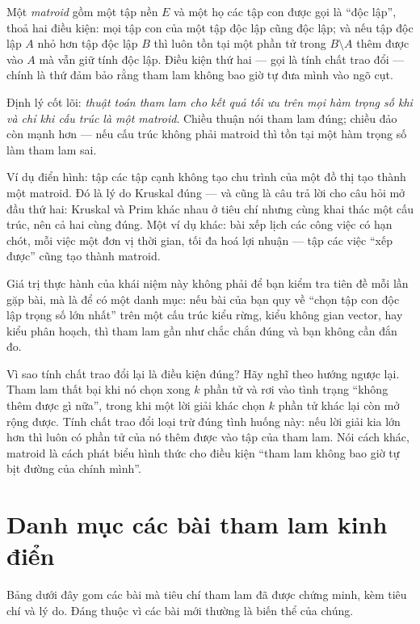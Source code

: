 \documentclass[../../algorithm.tex]{subfiles}
\begin{document}
Một \emph{matroid} gồm một tập nền \(E\) và một họ các tập con được gọi là ``độc lập'', thoả hai điều kiện: mọi tập con của một tập độc lập cũng độc lập; và nếu tập độc lập \(A\) nhỏ hơn tập độc lập \(B\) thì luôn tồn tại một phần tử trong \(B \setminus A\) thêm được vào \(A\) mà vẫn giữ tính độc lập. Điều kiện thứ hai --- gọi là tính chất trao đổi --- chính là thứ đảm bảo rằng tham lam không bao giờ tự đưa mình vào ngõ cụt.

Định lý cốt lõi: \emph{thuật toán tham lam cho kết quả tối ưu trên mọi hàm trọng số khi và chỉ khi cấu trúc là một matroid}. Chiều thuận nói tham lam đúng; chiều đảo còn mạnh hơn --- nếu cấu trúc không phải matroid thì tồn tại một hàm trọng số làm tham lam sai.

Ví dụ điển hình: tập các tập cạnh không tạo chu trình của một đồ thị tạo thành một matroid. Đó là lý do Kruskal đúng --- và cũng là câu trả lời cho câu hỏi mở đầu thứ hai: Kruskal và Prim khác nhau ở tiêu chí nhưng cùng khai thác một cấu trúc, nên cả hai cùng đúng. Một ví dụ khác: bài xếp lịch các công việc có hạn chót, mỗi việc một đơn vị thời gian, tối đa hoá lợi nhuận --- tập các việc ``xếp được'' cũng tạo thành matroid.

Giá trị thực hành của khái niệm này không phải để bạn kiểm tra tiên đề mỗi lần gặp bài, mà là để có một danh mục: nếu bài của bạn quy về ``chọn tập con độc lập trọng số lớn nhất'' trên một cấu trúc kiểu rừng, kiểu không gian vector, hay kiểu phân hoạch, thì tham lam gần như chắc chắn đúng và bạn không cần đắn đo.

\begin{trucgiac}
Vì sao tính chất trao đổi lại là điều kiện đúng? Hãy nghĩ theo hướng ngược lại. Tham lam thất bại khi nó chọn xong \(k\) phần tử và rơi vào tình trạng ``không thêm được gì nữa'', trong khi một lời giải khác chọn \(k\) phần tử khác lại còn mở rộng được. Tính chất trao đổi loại trừ đúng tình huống này: nếu lời giải kia lớn hơn thì luôn có phần tử của nó thêm được vào tập của tham lam. Nói cách khác, matroid là cách phát biểu hình thức cho điều kiện ``tham lam không bao giờ tự bịt đường của chính mình''.
\end{trucgiac}

\section{Danh mục các bài tham lam kinh điển}

Bảng dưới đây gom các bài mà tiêu chí tham lam đã được chứng minh, kèm tiêu chí và lý do. Đáng thuộc vì các bài mới thường là biến thể của chúng.
\end{document}
